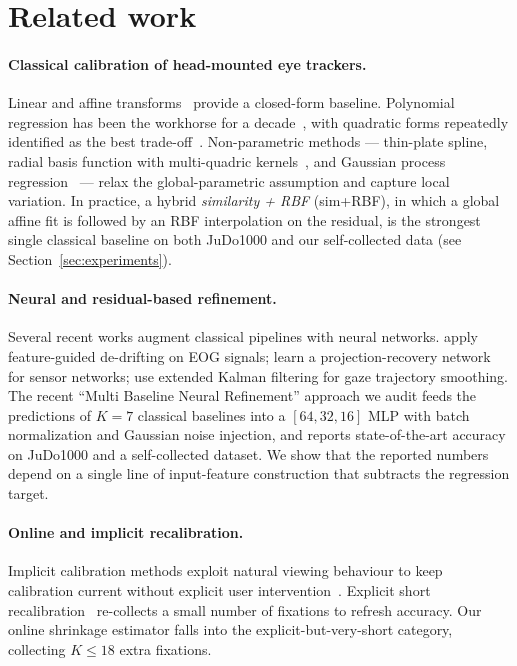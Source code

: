 \section{Related work}
\label{sec:related}

\paragraph{Classical calibration of head-mounted eye trackers.}
Linear and affine transforms~\citep{vadillo2015simple} provide a
closed-form baseline. Polynomial regression has been the workhorse for a
decade~\citep{cerrolaza2012polynomial,mardanbegi2018distribution}, with
quadratic forms repeatedly identified as the best
trade-off~\citep{ehinger2019eyelink,su2020locally}. Non-parametric
methods --- thin-plate spline, radial basis function with
multi-quadric kernels~\citep{scheel2016rbf}, and Gaussian process
regression~\citep{tripathi2017gpr} --- relax the global-parametric
assumption and capture local variation. In practice, a hybrid
\emph{similarity + RBF} (sim+RBF), in which a global affine fit is
followed by an RBF interpolation on the residual, is the
strongest single classical baseline on both JuDo1000 and our
self-collected data (see Section~\ref{sec:experiments}).

\paragraph{Neural and residual-based refinement.}
Several recent works augment classical pipelines with neural networks.
\citet{huang2025fgd} apply feature-guided de-drifting on EOG signals;
\citet{wang2017blind} learn a projection-recovery network for sensor
networks; \citet{thieu2025stochastic} use extended Kalman filtering for
gaze trajectory smoothing. The recent ``Multi Baseline Neural
Refinement'' approach we audit \citep{anon2026mbnr} feeds the
predictions of $K=7$ classical baselines into a $[64,32,16]$ MLP with
batch normalization and Gaussian noise injection, and reports
state-of-the-art accuracy on JuDo1000 and a self-collected dataset.
We show that the reported numbers depend on a single line of input-feature
construction that subtracts the regression target.

\paragraph{Online and implicit recalibration.}
Implicit calibration methods exploit natural viewing behaviour to keep
calibration current without explicit user
intervention~\citep{huang2019saccalib,muller2019mobile,wan2024selfcalib}.
Explicit short recalibration~\citep{lander2016time,hou2025xr} re-collects
a small number of fixations to refresh accuracy. Our online
shrinkage estimator falls into the explicit-but-very-short category,
collecting $K \le 18$ extra fixations.

